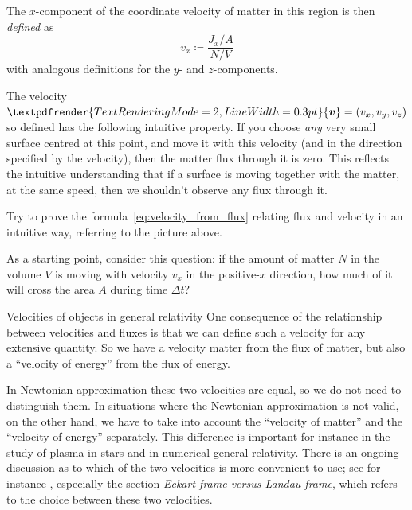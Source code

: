 \documentclass[a4paper,12pt,%
onecolumn,oneside,titlepage,%
british%
]{memoir}
\renewcommand*{\bm}[1]{\textpdfrender{TextRenderingMode=2,LineWidth=0.3pt}{\boldsymbol{#1}}}
\newcommand*{\incr}{\Delta}%
\newcommand*{\defd}{\coloneqq}
\renewcommand*{\|}[1][]{\nonscript\:#1\vert\nonscript\:\mathopen{}}
\newcommand*{\yv}{\bm{v}}
\newcommand*{\Dt}{\incr t}
\newcommand*{\yN}{N}
\begin{document}
The $x$-component of the coordinate velocity of matter in this region is then \emph{defined} as
\begin{equation}
  \label{eq:velocity_from_flux}
  v_{x} \defd \frac{J_{x}/A}{\yN/V}
\end{equation}
with analogous definitions for the $y$- and $z$-components.


The velocity $\yv=(v_{x}, v_{y}, v_{z})$ so defined has the following intuitive property. If you choose \emph{any} very small surface centred at this point, and move it with this velocity (and in the direction specified by the velocity), then the matter flux through it is zero. This reflects the intuitive understanding that if a surface is moving together with the matter, at the same speed, then we shouldn't observe any flux through it.

\begin{exercise}
  Try to prove the formula~\eqref{eq:velocity_from_flux} relating flux and velocity in an intuitive way, referring to the picture above.

  As a starting point, consider this question: if the amount of matter $\yN$ in the volume $V$ is moving with velocity $v_{x}$ in the positive-$x$ direction, how much of it will cross the area $A$ during time $\Dt$?
\end{exercise}

\medskip


\begin{extra}{Velocities of objects in general relativity}
  One consequence of the relationship between velocities and fluxes is that we can define such a velocity for any extensive quantity. So we have a velocity matter from the flux of matter, but also a \enquote{velocity of energy} from the flux of energy.

  In Newtonian approximation these two velocities are equal, so we do not need to distinguish them. In situations where the Newtonian approximation is not valid, on the other hand, we have to take into account the \enquote{velocity of matter} and the \enquote{velocity of energy} separately. This difference is important for instance in the study of plasma in stars and in numerical general relativity. There is an ongoing discussion as to which of the two velocities is more convenient to use; see for instance \cites{kandusetal2008}, especially the section \emph{Eckart frame versus Landau frame}, which refers to the choice between these two velocities.
\end{extra}
\end{document}
